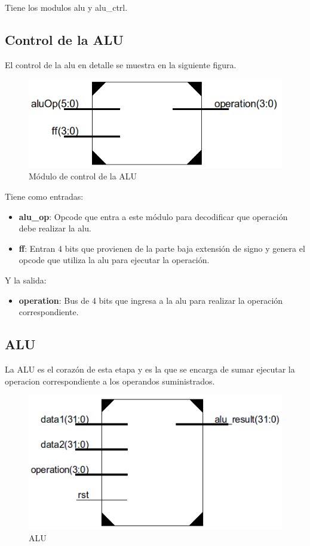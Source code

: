Tiene los modulos alu y alu\_ctrl.

\subsection{Control de la ALU}
El control de la alu en detalle se muestra en la siguiente figura.

\begin{figure}[H]
\centering
\includegraphics[scale=0.5]{img/alu_ctrl}
\caption{M\'odulo de control de la ALU}
\label{fig:fetch}
\end{figure}

Tiene como entradas:

\begin{itemize}
  \item \textbf{alu\_op}: Opcode que entra a este m\'odulo para decodificar que operaci\'on debe realizar la alu.
  \item \textbf{ff}: Entran 4 bits que provienen de la parte baja extensi\'on de signo y genera el opcode que utiliza la alu para ejecutar la operaci\'on.  
\end{itemize}

Y la salida:
\begin{itemize}
  \item \textbf{operation}: Bus de 4 bits que ingresa a la alu para realizar la operaci\'on correspondiente.
\end{itemize}

\subsection{ALU} 
La ALU es el coraz\'on de esta etapa y es la que se encarga de sumar ejecutar la operacion correspondiente a los operandos suministrados.

\begin{figure}[H]
\centering
\includegraphics[scale=0.5]{img/alu}
\caption{ALU}
\label{fig:fetch}
\end{figure}

